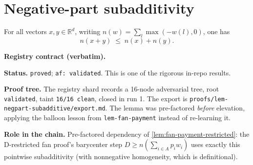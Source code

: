 \section{Negative-part subadditivity}\label{sec:negpart-subadditive}

\begin{lemma}\label{lem:negpart-subadditive}
For all vectors $x,y\in\mathbb{R}^d$, writing $n(w)=\sum_l\max(-w(l),0)$, one has
\[
  n(x+y)\;\le\;n(x)+n(y).
\]
\end{lemma}

\noindent\textbf{Registry contract (verbatim).}

\noindent\textbf{Status.} \texttt{proved}; \texttt{af: validated}.
This is one of the rigorous in-repo results.

\noindent\textbf{Proof tree.} The registry shard records a 16-node
adversarial tree, root \texttt{validated}, taint \texttt{16/16 clean},
closed in run 1.  The export is
\texttt{proofs/lem-negpart-subadditive/export.md}.  The lemma was
pre-factored \emph{before} elevation, applying the balloon lesson from
\texttt{lem-fan-payment} instead of re-learning it.

\noindent\textbf{Role in the chain.} Pre-factored dependency of
\ref{lem:fan-payment-restricted}: the D-restricted fan proof's
barycenter step $D \ge n(\sum_{i \in A} p_i w_i)$ uses exactly this
pointwise subadditivity (with nonnegative homogeneity, which is
definitional).
